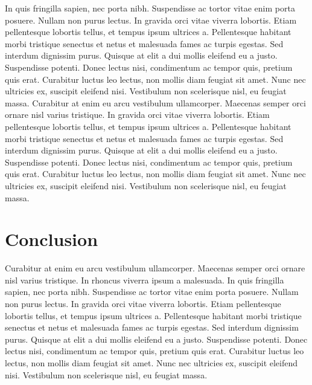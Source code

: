 \documentclass[11pt]{report}
\begin{document}
In quis fringilla sapien, nec porta nibh. Suspendisse ac tortor vitae enim porta posuere. Nullam non purus lectus. In gravida orci vitae viverra lobortis. Etiam pellentesque lobortis tellus, et tempus ipsum ultrices a. Pellentesque habitant morbi tristique senectus et netus et malesuada fames ac turpis egestas. Sed interdum dignissim purus. Quisque at elit a dui mollis eleifend eu a justo. Suspendisse potenti. Donec lectus nisi, condimentum ac tempor quis, pretium quis erat. Curabitur luctus leo lectus, non mollis diam feugiat sit amet. Nunc nec ultricies ex, suscipit eleifend nisi. Vestibulum non scelerisque nisl, eu feugiat massa. Curabitur at enim eu arcu vestibulum ullamcorper. Maecenas semper orci ornare nisl varius tristique. In gravida orci vitae viverra lobortis. Etiam pellentesque lobortis tellus, et tempus ipsum ultrices a. Pellentesque habitant morbi tristique senectus et netus et malesuada fames ac turpis egestas. Sed interdum dignissim purus. Quisque at elit a dui mollis eleifend eu a justo. Suspendisse potenti. Donec lectus nisi, condimentum ac tempor quis, pretium quis erat. Curabitur luctus leo lectus, non mollis diam feugiat sit amet. Nunc nec ultricies ex, suscipit eleifend nisi. Vestibulum non scelerisque nisl, eu feugiat massa.

\section*{Conclusion}

Curabitur at enim eu arcu vestibulum ullamcorper. Maecenas semper orci ornare nisl varius tristique. In rhoncus viverra ipsum a malesuada. In quis fringilla sapien, nec porta nibh. Suspendisse ac tortor vitae enim porta posuere. Nullam non purus lectus. In gravida orci vitae viverra lobortis. Etiam pellentesque lobortis tellus, et tempus ipsum ultrices a. Pellentesque habitant morbi tristique senectus et netus et malesuada fames ac turpis egestas. Sed interdum dignissim purus. Quisque at elit a dui mollis eleifend eu a justo. Suspendisse potenti. Donec lectus nisi, condimentum ac tempor quis, pretium quis erat. Curabitur luctus leo lectus, non mollis diam feugiat sit amet. Nunc nec ultricies ex, suscipit eleifend nisi. Vestibulum non scelerisque nisl, eu feugiat massa.


\end{document}
